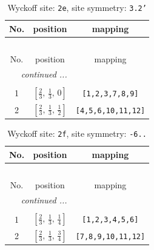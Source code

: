 \documentclass[fleqn,8pt]{jsarticle}
\begin{document}
\begin{longtable}{ccc}
\caption{Wyckoff site: {\tt 2e}, site symmetry: {\tt 3.2'}}
 \\
 \hline \hline
No. & position & mapping \\ \hline \endfirsthead

\multicolumn{2}{l}{\tablename\ \thetable{}} \\
 \hline \hline
No. & position & mapping \\ \hline \endhead

 \hline \hline
\multicolumn{2}{r}{\footnotesize\it continued ...} \\ \endfoot

 \hline \hline
\multicolumn{2}{r}{} \\ \endlastfoot

1 & $\left[ \frac{2}{3},\, \frac{1}{3},\, 0 \right]$ & {\tt [1,2,3,7,8,9]} \\ \hline
2 & $\left[ \frac{2}{3},\, \frac{1}{3},\, \frac{1}{2} \right]$ & {\tt [4,5,6,10,11,12]} \\
\end{longtable}
\renewcommand{\arraystretch}{1.2}
\begin{longtable}{ccc}
\caption{Wyckoff site: {\tt 2f}, site symmetry: {\tt -6..}}
 \\
 \hline \hline
No. & position & mapping \\ \hline \endfirsthead

\multicolumn{2}{l}{\tablename\ \thetable{}} \\
 \hline \hline
No. & position & mapping \\ \hline \endhead

 \hline \hline
\multicolumn{2}{r}{\footnotesize\it continued ...} \\ \endfoot

 \hline \hline
\multicolumn{2}{r}{} \\ \endlastfoot

1 & $\left[ \frac{2}{3},\, \frac{1}{3},\, \frac{1}{4} \right]$ & {\tt [1,2,3,4,5,6]} \\ \hline
2 & $\left[ \frac{2}{3},\, \frac{1}{3},\, \frac{3}{4} \right]$ & {\tt [7,8,9,10,11,12]} \\
\end{longtable}
\renewcommand{\arraystretch}{1.2}
\end{document}
